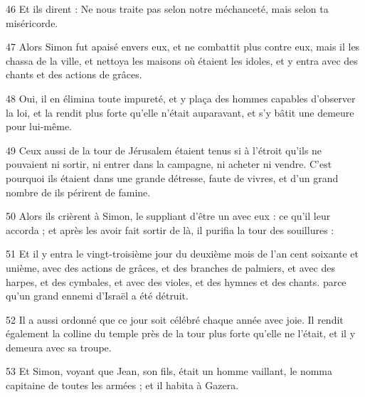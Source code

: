 \par 46 Et ils dirent : Ne nous traite pas selon notre méchanceté, mais selon ta miséricorde.
\par 47 Alors Simon fut apaisé envers eux, et ne combattit plus contre eux, mais il les chassa de la ville, et nettoya les maisons où étaient les idoles, et y entra avec des chants et des actions de grâces.
\par 48 Oui, il en élimina toute impureté, et y plaça des hommes capables d'observer la loi, et la rendit plus forte qu'elle n'était auparavant, et s'y bâtit une demeure pour lui-même.
\par 49 Ceux aussi de la tour de Jérusalem étaient tenus si à l'étroit qu'ils ne pouvaient ni sortir, ni entrer dans la campagne, ni acheter ni vendre. C'est pourquoi ils étaient dans une grande détresse, faute de vivres, et d'un grand nombre de ils périrent de famine.
\par 50 Alors ils crièrent à Simon, le suppliant d'être un avec eux : ce qu'il leur accorda ; et après les avoir fait sortir de là, il purifia la tour des souillures :
\par 51 Et il y entra le vingt-troisième jour du deuxième mois de l'an cent soixante et unième, avec des actions de grâces, et des branches de palmiers, et avec des harpes, et des cymbales, et avec des violes, et des hymnes et des chants. parce qu'un grand ennemi d'Israël a été détruit.
\par 52 Il a aussi ordonné que ce jour soit célébré chaque année avec joie. Il rendit également la colline du temple près de la tour plus forte qu'elle ne l'était, et il y demeura avec sa troupe.
\par 53 Et Simon, voyant que Jean, son fils, était un homme vaillant, le nomma capitaine de toutes les armées ; et il habita à Gazera.


